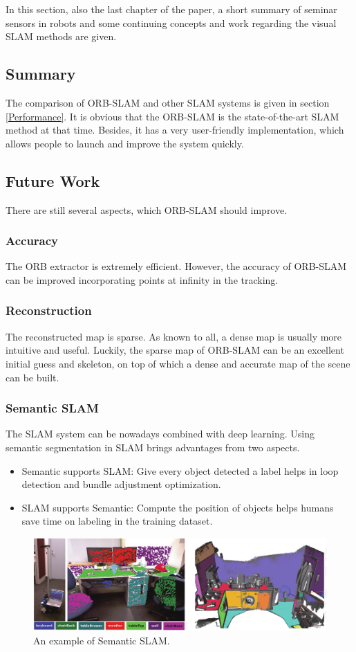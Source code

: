 \documentclass[letterpaper, 10 pt, conference]{ieeeconf}  %
\begin{document}
In this section, also the last chapter of the paper, a short summary of seminar sensors in robots and some continuing concepts and work regarding the visual SLAM methods are given.

\subsection{Summary}
The comparison of ORB-SLAM and other SLAM systems is given in section \ref{Performance}. It is obvious that the ORB-SLAM is the state-of-the-art SLAM method at that time. Besides, it has a very user-friendly implementation, which allows people to launch and improve the system quickly. 

\subsection{Future Work}
There are still several aspects, which ORB-SLAM should improve.
\subsubsection{Accuracy}
The ORB extractor is extremely efficient. However, the accuracy of ORB-SLAM can be improved incorporating points at infinity in the tracking.
\subsubsection{Reconstruction}
The reconstructed map is sparse. As known to all, a dense map is usually more intuitive and useful. Luckily, the sparse map of ORB-SLAM can be an excellent initial guess and skeleton, on top of which a dense and accurate map of the scene can be built.
\subsubsection{Semantic SLAM}
The SLAM system can be nowadays combined with deep learning. Using semantic segmentation in SLAM brings advantages from two aspects.
%
\begin{itemize}
\item Semantic supports SLAM: Give every object detected a label helps in loop detection and bundle adjustment optimization.
\item SLAM supports Semantic: Compute the position of objects helps humans save time on labeling in the training dataset.
\end{itemize}
%
\begin{figure}[!htbp]
\centering
\includegraphics[scale=0.14]{./images/semantic_slam}
\caption{An example of Semantic SLAM. \cite{Semantic}}
\label{semantic_slam}
\end{figure}
\end{document}

